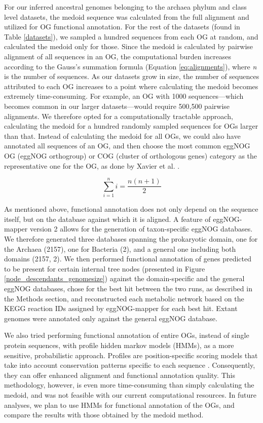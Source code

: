 For our inferred ancestral genomes belonging to the archaea phylum and class level datasets, the medoid sequence was calculated from the full alignment and utilized for OG functional annotation. For the rest of the datasets (found in Table \ref{datasets}), we sampled a hundred sequences from each OG at random, and calculated the medoid only for those. Since the medoid is calculated by pairwise alignment of all sequences in an OG, the computational burden increases according to the Gauss's summation formula (Equation \ref{eq:alignments}), where \textit{n} is the number of sequences. As our datasets grow in size, the number of sequences attributed to each OG increases to a point where calculating the medoid becomes extremely time-consuming. For example, an OG with 1000 sequences---which becomes common in our larger datasets---would require 500,500 pairwise alignments. We therefore opted for a computationally tractable approach, calculating the medoid for a hundred randomly sampled sequences for OGs larger than that. Instead of calculating the medoid for all OGs, we could also have annotated all sequences of an OG, and then choose the most common eggNOG OG (eggNOG orthogroup) or COG (cluster of orthologous genes) category as the representative one for the OG, as done by Xavier et al. \cite{xavier2021}. 

\begin{equation}
    \label{eq:alignments}
    \sum_{i=1}^{n} i = \frac{n(n+1)}{2}
\end{equation}

As mentioned above, functional annotation does not only depend on the sequence itself, but on the database against which it is aligned. A feature of eggNOG-mapper version 2 \cite{cantalapiedra2021} allows for the generation of taxon-specific eggNOG databases. We therefore generated three databases spanning the prokaryotic domain, one for the Archaea (2157), one for Bacteria (2), and a general one including both domains (2157, 2). We then performed functional annotation of genes predicted to be present for certain internal tree nodes (presented in Figure \ref{node_descendants_genomesize}) against the domain-specific and the general eggNOG databases, chose for the best hit between the two runs, as described in the Methods section, and reconstructed each metabolic network based on the KEGG reaction IDs assigned by eggNOG-mapper for each best hit. Extant genomes were annotated only against the general eggNOG database. 

We also tried performing functional annotation of entire OGs, instead of single protein sequences, with profile hidden markov models (HMMs), as a more sensitive, probabilistic approach. Profiles are position-specific scoring models that take into account conservation patterns specific to each sequence \cite{mount2009, gribskov1987}. Consequently, they can offer enhanced alignment and functional annotation quality. This methodology, however, is even more time-consuming than simply calculating the medoid, and was not feasible with our current computational resources. In future analyses, we plan to use HMMs for functional annotation of the OGs, and compare the results with those obtained by the medoid method.

